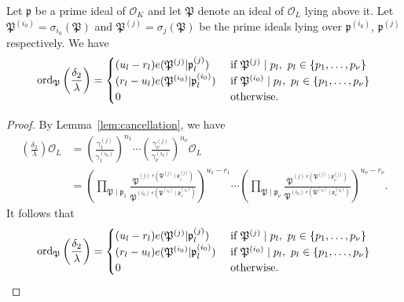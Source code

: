 \begin{lemma}\label{lem:ordpz}
Let $\mathfrak{p}$ be a prime ideal of $\mathcal{O}_K$ and let $\mathfrak{P}$ denote an ideal of $\mathcal{O}_L$ lying above it. Let $\mathfrak{P}^{(i_0)} = \sigma_{i_0}(\mathfrak{P})$ and $\mathfrak{P}^{(j)} = \sigma_{j}(\mathfrak{P})$ be the prime ideals lying over $\mathfrak{p}^{(i_0)}$, $\mathfrak{p}^{(j)}$ respectively. We have
\[\operatorname{ord}_{\mathfrak{P}}\left(\frac{\delta_2}{\lambda}\right)=
\begin{cases}
(u_l - r_l)e(\mathfrak{P}^{(j)}|\mathfrak{p}_l^{(j)})	
	& \textnormal{ if } \mathfrak{P}^{(j)} \mid p_l , \ p_l \in \{p_1,\dots, p_{\nu}\}\\
(r_l - u_l)e(\mathfrak{P}^{(i_0)}|\mathfrak{p}_l^{(i_0)})
	& \textnormal{ if } \mathfrak{P}^{(i_0)}\mid p_l, \ p_l \in \{p_1,\dots, p_{\nu}\}\\
0 	& \textnormal{ otherwise}.
\end{cases}\]
\end{lemma}
\begin{proof}

By Lemma~\ref{lem:cancellation}, we have 
\begin{align*}
\left(\frac{\delta_2}{\lambda}\right)\mathcal{O}_L
	& = \left( \frac{\gamma_1^{(j)}}{\gamma_1^{(i_0)}}\right)^{n_1}\cdots \left( \frac{\gamma_{\nu}^{(j)}}{\gamma_{\nu}^{(i_0)}}\right)^{n_{\nu}} \mathcal{O}_L\\
	& = \left(\prod_{\mathfrak{P}\mid\mathfrak{p}_1} \frac{\mathfrak{P}^{(j) \ e(\mathfrak{P}^{(j)}\mid\mathfrak{p}_1^{(j)})}}{\mathfrak{P}^{(i_0) \ e(\mathfrak{P}^{(i_0)}\mid\mathfrak{p}^{(i_0)}_1)}}\right)^{u_1 - r_1} \cdots \left(\prod_{\mathfrak{P}\mid\mathfrak{p}_{\nu}} \frac{\mathfrak{P}^{(j) \ e(\mathfrak{P}^{(j)}\mid\mathfrak{p}^{(j)}_{\nu})}}{\mathfrak{P}^{(i_0) \ e(\mathfrak{P}^{(i_0)}\mid\mathfrak{p}^{(i_0)}_{\nu})}}\right)^{u_{\nu} - r_{\nu}}.
\end{align*}
It follows that 
\[\operatorname{ord}_{\mathfrak{P}}\left( \frac{\delta_2}{\lambda}\right)=
\begin{cases}
(u_l - r_l)e(\mathfrak{P}^{(j)}|\mathfrak{p}_l^{(j)})	
	& \textnormal{ if } \mathfrak{P}^{(j)} \mid p_l , \ p_l \in \{p_1,\dots, p_{\nu}\}\\
(r_l - u_l)e(\mathfrak{P}^{(i_0)}|\mathfrak{p}_l^{(i_0)})
	& \textnormal{ if } \mathfrak{P}^{(i_0)}\mid p_l, \ p_l \in \{p_1,\dots, p_{\nu}\}\\
0 	& \textnormal{ otherwise}.
\end{cases}\]
\end{proof}

